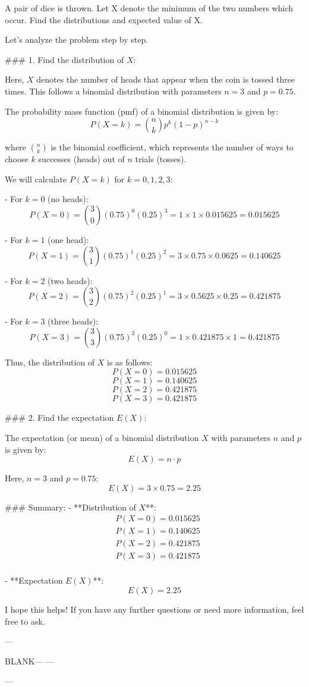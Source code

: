 
A pair of dice is thrown. Let X denote the minimum of the two numbers which occur.
Find the  distributions and expected value of X.


Let's analyze the problem step by step.

### 1. Find the distribution of \( X \):

Here, \( X \) denotes the number of heads that appear when the coin is tossed three times. This follows a binomial distribution with parameters \( n = 3 \) and \( p = 0.75 \).

The probability mass function (pmf) of a binomial distribution is given by:
\[ P(X = k) = \binom{n}{k} p^k (1-p)^{n-k} \]

where \( \binom{n}{k} \) is the binomial coefficient, which represents the number of ways to choose \( k \) successes (heads) out of \( n \) trials (tosses).

We will calculate \( P(X = k) \) for \( k = 0, 1, 2, 3 \):

- For \( k = 0 \) (no heads):
\[ P(X = 0) = \binom{3}{0} (0.75)^0 (0.25)^3 = 1 \times 1 \times 0.015625 = 0.015625 \]

- For \( k = 1 \) (one head):
\[ P(X = 1) = \binom{3}{1} (0.75)^1 (0.25)^2 = 3 \times 0.75 \times 0.0625 = 0.140625 \]

- For \( k = 2 \) (two heads):
\[ P(X = 2) = \binom{3}{2} (0.75)^2 (0.25)^1 = 3 \times 0.5625 \times 0.25 = 0.421875 \]

- For \( k = 3 \) (three heads):
\[ P(X = 3) = \binom{3}{3} (0.75)^3 (0.25)^0 = 1 \times 0.421875 \times 1 = 0.421875 \]

Thus, the distribution of \( X \) is as follows:
\[ P(X = 0) = 0.015625 \]
\[ P(X = 1) = 0.140625 \]
\[ P(X = 2) = 0.421875 \]
\[ P(X = 3) = 0.421875 \]

### 2. Find the expectation \( E(X) \):

The expectation (or mean) of a binomial distribution \( X \) with parameters \( n \) and \( p \) is given by:
\[ E(X) = n \cdot p \]

Here, \( n = 3 \) and \( p = 0.75 \):
\[ E(X) = 3 \times 0.75 = 2.25 \]

### Summary:
- **Distribution of \( X \)**:
  \[
  \begin{aligned}
  &P(X = 0) = 0.015625 \\
  &P(X = 1) = 0.140625 \\
  &P(X = 2) = 0.421875 \\
  &P(X = 3) = 0.421875 \\
  \end{aligned}
  \]

- **Expectation \( E(X) \)**:
  \[ E(X) = 2.25 \]

I hope this helps! If you have any further questions or need more information, feel free to ask.


---

BLANK---
---

---